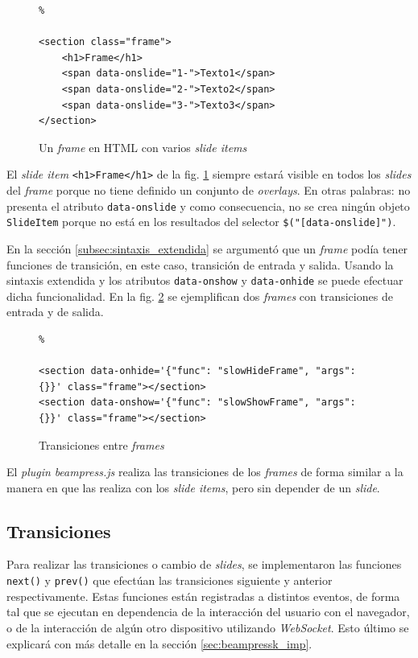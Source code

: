 			\begin{figure}[htb]%
				\begin{lstlisting}%

<section class="frame">
	<h1>Frame</h1>
	<span data-onslide="1-">Texto1</span>
	<span data-onslide="2-">Texto2</span>
	<span data-onslide="3-">Texto3</span>
</section>
				\end{lstlisting}
				\caption{Un \textit{frame} en HTML con varios \textit{slide items}}
				\label{fig:frame_html_slides}
			\end{figure}

			El \textit{slide item} \texttt{<h1>Frame</h1>} de la fig. \ref{fig:frame_html_slides} siempre estará visible en todos los \textit{slides} del \textit{frame} porque no tiene definido un conjunto de \textit{overlays}. En otras palabras: no presenta el atributo \texttt{data-onslide} y como consecuencia, no se crea ningún objeto \texttt{SlideItem} porque no está en los resultados del selector \texttt{\$("[data-onslide]")}.


			En la sección \ref{subsec:sintaxis_extendida} se argumentó que un \textit{frame} podía tener funciones de transición, en este caso, transición de entrada y salida. Usando la sintaxis extendida y los atributos \texttt{data-onshow} y \texttt{data-onhide} se puede efectuar dicha funcionalidad. En la fig. \ref{fig:frames_transitions} se ejemplifican dos \textit{frames} con transiciones de entrada y de salida.


		\begin{figure}[htb]%
			\begin{lstlisting}%

<section data-onhide='{"func": "slowHideFrame", "args": {}}' class="frame"></section>
<section data-onshow='{"func": "slowShowFrame", "args": {}}' class="frame"></section>
			\end{lstlisting}
		\caption{Transiciones entre \textit{frames}}
		\label{fig:frames_transitions}
		\end{figure}	

		El \textit{plugin} \textit{beampress.js} realiza las transiciones de los \textit{frames} de forma similar a la manera en que las realiza con los \textit{slide items}, pero sin depender de un \textit{slide}.

		\subsection{Transiciones} %
		\label{sub:transiciones}
			Para realizar las transiciones o cambio de \textit{slides}, se implementaron las funciones \texttt{next()} y \texttt{prev()} que efectúan las transiciones siguiente y anterior respectivamente. Estas funciones están registradas a distintos eventos, de forma tal que se ejecutan en dependencia de la interacción del usuario con el navegador, o de la interacción de algún otro dispositivo utilizando \textit{WebSocket}. Esto último se explicará con más detalle en la sección \ref{sec:beampressk_imp}.


